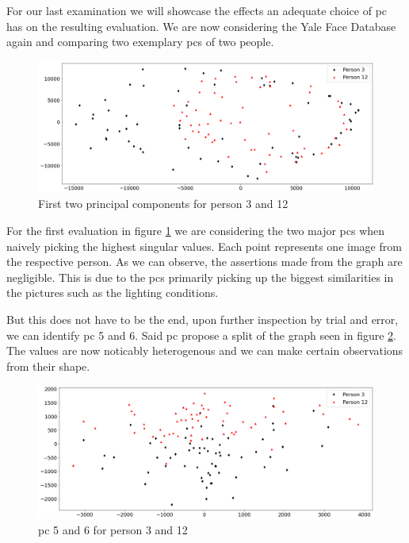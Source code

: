 For our last examination we will showcase the effects an adequate choice of \acrlong{pc} has on the resulting evaluation.
We are now considering the Yale Face Database again and comparing two exemplary \glspl{pc} of two people.

\begin{center}
    \begin{figure}[h]
      \centering
      \includegraphics[width=0.94\linewidth]{external_content/media/choice_of_pc/p3_12-pc1_2-centered.png}
      \captionsetup{justification=centering}
      \caption{First two principal components for person 3 and 12}
      \label{fig:pcIandII}
    \end{figure}
\end{center}

\vspace{-12mm}
For the first evaluation in figure \ref{fig:pcIandII} we are considering the two major \glspl{pc} when naively picking the highest singular values.
Each point represents one image from the respective person.
As we can observe, the assertions made from the graph are negligible.
This is due to the \glspl{pc} primarily picking up the biggest similarities in the pictures such as the lighting conditions.

But this does not have to be the end, upon further inspection by trial and error, we can identify \gls{pc} 5 and 6.
Said \gls{pc} propose a split of the graph seen in figure \ref{fig:pcVandVI}.
The values are now noticably heterogenous and we can make certain observations from their shape.

\begin{center}
    \begin{figure}[h]
      \centering
      \includegraphics[width=0.94\linewidth]{external_content/media/choice_of_pc/p3_12-pc5_6-centered.png}
      \captionsetup{justification=centering}
      \caption{\gls{pc} 5 and 6 for person 3 and 12}
      \label{fig:pcVandVI}
    \end{figure}
\end{center}

